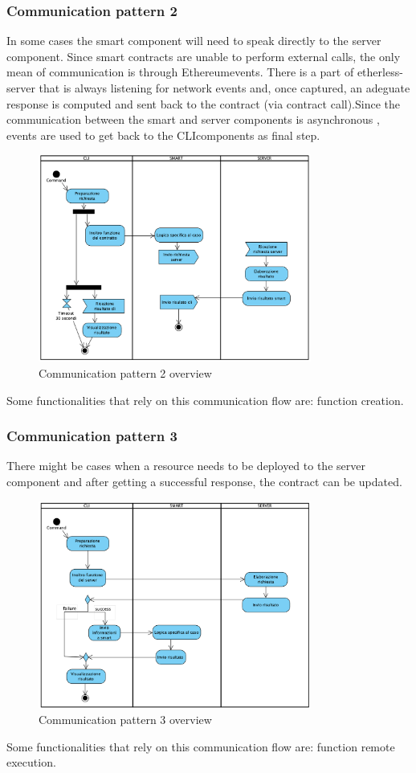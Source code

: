 \subsubsection{Communication pattern 2}
In some cases the smart component will need to speak directly to the server component. Since smart contracts are unable to perform external calls, the only mean of communication is through Ethereum\glo events. There is a part of etherless-server that is always listening for network events and, once captured, an adeguate response is computed and sent back to the contract (via contract call).\newline Since the communication between the smart and server components is asynchronous , events are used to get back to the CLI\glo components as final step.
\begin{figure}[H]
	\centering
	\includegraphics[width=0.8\textwidth]{res/img/pattern2.png}
	\caption{Communication pattern 2 overview}
\end{figure}
\noindent Some functionalities that rely on this communication flow are: function creation.
\newpage
\subsubsection{Communication pattern 3}
There might be cases when a resource needs to be deployed to the server component and after getting a successful response, the contract can be updated.
\begin{figure}[H]
	\centering
	\includegraphics[width=0.8\textwidth]{res/img/pattern3.png}
	\caption{Communication pattern 3 overview}
\end{figure}
\noindent Some functionalities that rely on this communication flow are: function remote execution. 
